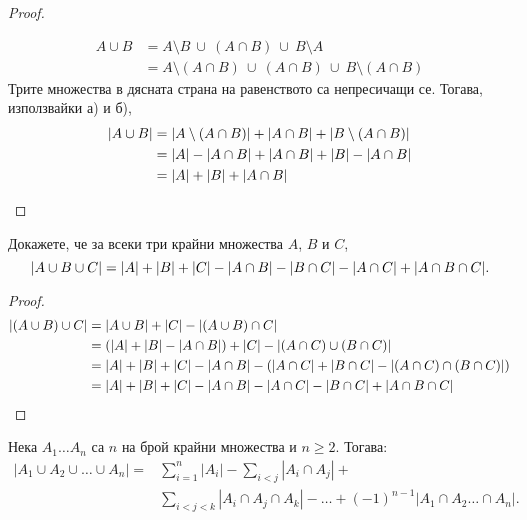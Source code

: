 \begin{proof}
\begin{enumerate}[a)]
\begin{align*}
      A\cup B & = A \setminus B\ \cup\ (A\cap B)\ \cup\ B\setminus A\\
      & = A\setminus (A\cap B)\ \cup\ (A\cap B)\ \cup\ B\setminus (A\cap B)
    \end{align*}
    Трите множества в дясната страна на равенството са непресичащи се.
    Тогава, използвайки а) и б), 
    \begin{align*}
      \lvert{A \cup B}\rvert & = \lvert{ A\setminus (A\cap B)}\rvert + \lvert{A\cap B}\rvert + \lvert{B\setminus (A\cap B)}\rvert\\
      & = \lvert{A}\rvert - \lvert{A\cap B}\rvert + \lvert{A \cap B}\rvert + \lvert{B}\rvert - \lvert{A\cap B}\rvert\\
      & = \lvert{A}\rvert + \lvert{B}\rvert + \lvert{A \cap B}\rvert
    \end{align*}
  \end{enumerate}
\end{proof}

\begin{prop}
  Докажете, че за всеки три крайни множества $A$, $B$ и $C$,
  \[\lvert{A\cup B \cup C}\rvert = \lvert{A}\rvert+\lvert{B}\rvert+\lvert{C}\rvert - \lvert{A\cap B}\rvert - \lvert{B\cap C}\rvert - \lvert{A\cap C}\rvert+ \lvert{A\cap B \cap C}\rvert.\]
\end{prop}
\begin{proof}
  \begin{align*}
    \lvert{(A \cup B) \cup C}\rvert & = \lvert{A \cup B}\rvert + \lvert{C}\rvert - \lvert{(A\cup B)\cap C}\rvert\\
    & = (\lvert{A}\rvert + \lvert{B}\rvert - \lvert{A\cap B}\rvert) + \lvert{C}\rvert - \lvert{(A\cap C)\cup(B\cap C)}\rvert\\
    & = \lvert{A}\rvert + \lvert{B}\rvert + \lvert{C}\rvert - \lvert{A\cap B}\rvert - (\lvert{A\cap C}\rvert + \lvert{B\cap C}\rvert - \lvert{(A\cap C) \cap (B\cap C)}\rvert)\\
    & = \lvert{A}\rvert + \lvert{B}\rvert + \lvert{C}\rvert - \lvert{A\cap B}\rvert - \lvert{A\cap C}\rvert - \lvert{B\cap C}\rvert + \lvert{A\cap B \cap C}\rvert
  \end{align*}
\end{proof}


\begin{framed}
\begin{thm}
  Нека $A_1\dots A_n$ са $n$ на брой крайни множества и $n\geq 2$. Тогава:
  \begin{align*}
    |A_1\cup A_2\cup \dots \cup A_n| = & \sum^n_{i=1} |A_i| - \sum_{i < j} |A_{i}\cap A_{j}| + \\
    & \sum_{i < j < k} |A_{i}\cap A_{j}\cap A_{k}|- \dots + (-1)^{n-1}|A_1 \cap A_2\dots \cap A_n|.    
  \end{align*}
\end{thm}
\end{framed}

